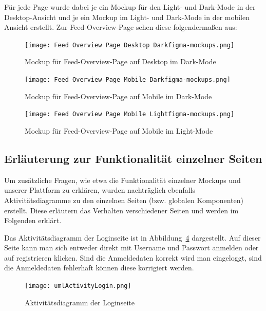 Für jede Page wurde dabei je ein Mockup für den Light- und Dark-Mode in der Desktop-Ansicht 
und je ein Mockup im Light- und Dark-Mode in der mobilen Ansicht erstellt.
Zur Feed-Overview-Page sehen diese folgendermaßen aus:

\begin{figure}[H]
    \texttt{[image: Feed Overview Page Desktop Darkfigma-mockups.png]}
    \caption{Mockup für Feed-Overview-Page auf Desktop im Dark-Mode}
    \label{fig:Feed Overview Page Dark Desktop}
\end{figure}

\begin{figure}[H]
    \begin{center}
        \texttt{[image: Feed Overview Page Mobile Darkfigma-mockups.png]}
    \end{center}
    \caption{Mockup für Feed-Overview-Page auf Mobile im Dark-Mode}
    \label{fig:Feed Overview Page Light Mobile}
\end{figure}


\begin{figure}[H]
    \begin{center}
        \texttt{[image: Feed Overview Page Mobile Lightfigma-mockups.png]}
    \end{center}
    \caption{Mockup für Feed-Overview-Page auf Mobile im Light-Mode}
    \label{fig:Feed Overview Page Light Mobile}
\end{figure}


\subsection{Erläuterung zur Funktionalität einzelner Seiten}

Um zusätzliche Fragen, wie etwa die Funktionalität einzelner Mockups und unserer Plattform zu erklären, wurden nachträglich ebenfalls Aktivitätsdiagramme zu den einzelnen Seiten (bzw. globalen Komponenten) erstellt.
Diese erläutern das Verhalten verschiedener Seiten und werden im Folgenden erklärt.

Das Aktivitätsdiagramm der Loginseite ist in Abbildung~\ref{fig:umlActivityLogin.png} dargestellt.
Auf dieser Seite kann man sich entweder direkt mit Username und Passwort anmelden oder auf registrieren klicken.
Sind die Anmeldedaten korrekt wird man eingeloggt, sind die Anmeldedaten fehlerhaft können diese korrigiert werden.
\begin{figure}
    \texttt{[image: umlActivityLogin.png]}
    \caption{Aktivitätsdiagramm der Loginseite}
    \label{fig:umlActivityLogin.png}
\end{figure}

